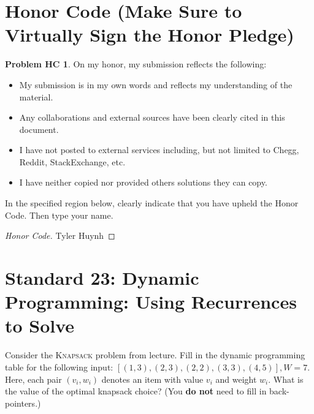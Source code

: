 \documentclass[11pt]{article}
\theoremstyle{definition}
\theoremstyle{definition}
\newtheorem*{requiredHC}{Problem HC}
\theoremstyle{definition}
\begin{document}
\section*{Honor Code (Make Sure to Virtually Sign the Honor Pledge)} 
\hypertarget{HonorCode}{}

\begin{requiredHC}
On my honor, my submission reflects the following:
\begin{itemize}
\item My submission is in my own words and reflects my understanding of the material.
\item Any collaborations and external sources have been clearly cited in this document.
\item I have not posted to external services including, but not limited to Chegg, Reddit, StackExchange, etc.
\item I have neither copied nor provided others solutions they can copy.
\end{itemize}

\noindent In the specified region below, clearly indicate that you have upheld the Honor Code. Then type your name. 
\end{requiredHC}

\begin{proof}[Honor Code]
Tyler Huynh
\end{proof}

\newpage
\section{Standard 23: Dynamic Programming: Using Recurrences to Solve}
Consider the \textsc{Knapsack} problem from lecture. Fill in the dynamic programming table for the following input: $[(1, 3), (2, 3), (2, 2), (3, 3), (4, 5)], W=7$. Here, each pair $(v_i, w_i)$ denotes an item with value $v_i$ and weight $w_i$. What is the value of the optimal knapsack choice? (You \textbf{do not} need to fill in back-pointers.)
\end{document}
